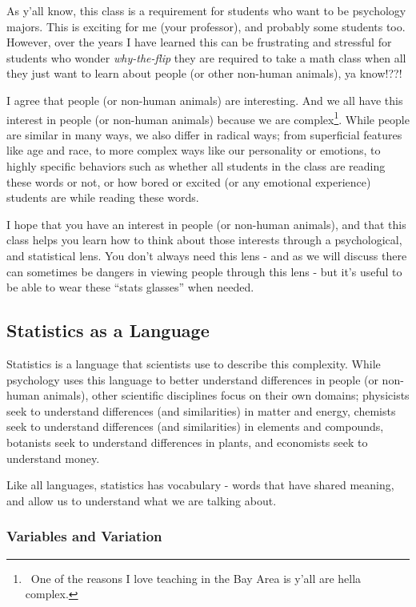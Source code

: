 \documentclass[
  letterpaper,
  DIV=11,
  numbers=noendperiod,
  oneside]{scrreprt}
\begin{document}
As y'all know, this class is a requirement for students who want to be
psychology majors. This is exciting for me (your professor), and
probably some students too. However, over the years I have learned this
can be frustrating and stressful for students who wonder
\emph{why-the-flip} they are required to take a math class when all they
just want to learn about people (or other non-human animals), ya
know!??!

I agree that people (or non-human animals) are interesting. And we all
have this interest in people (or non-human animals) because we are
complex\footnote{~One of the reasons I love teaching in the Bay Area is
  y'all are hella complex.}. While people are similar in many ways, we
also differ in radical ways; from superficial features like age and
race, to more complex ways like our personality or emotions, to highly
specific behaviors such as whether all students in the class are reading
these words or not, or how bored or excited (or any emotional
experience) students are while reading these words.

I hope that you have an interest in people (or non-human animals), and
that this class helps you learn how to think about those interests
through a psychological, and statistical lens. You don't always need
this lens - and as we will discuss there can sometimes be dangers in
viewing people through this lens - but it's useful to be able to wear
these ``stats glasses'' when needed.

\subsection{Statistics as a Language}\label{statistics-as-a-language}

Statistics is a language that scientists use to describe this
complexity. While psychology uses this language to better understand
differences in people (or non-human animals), other scientific
disciplines focus on their own domains; physicists seek to understand
differences (and similarities) in matter and energy, chemists seek to
understand differences (and similarities) in elements and compounds,
botanists seek to understand differences in plants, and economists seek
to understand money.

Like all languages, statistics has vocabulary - words that have shared
meaning, and allow us to understand what we are talking about.

\subsubsection{Variables and Variation}\label{variables-and-variation}
\end{document}
